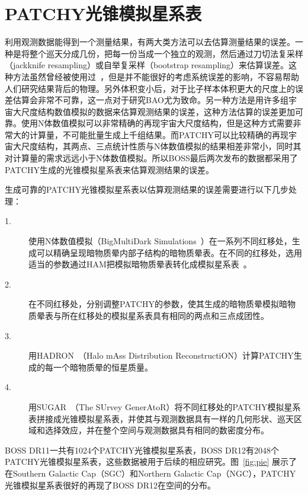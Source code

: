 \section{\textsc{PATCHY}光锥模拟星系表}
\label{sec:lightcone}

利用观测数据能得到一个测量结果，有两大类方法可以去估算测量结果的误差。一种是将整个巡天分成几份，把每一份当成一个独立的观测，然后通过刀切法复采样（jackknife resampling）或自举复采样（bootstrap resampling）来估算误差。这种方法虽然曾经被使用过~\cite{Norberg2009}，但是并不能很好的考虑系统误差的影响，不容易帮助人们研究结果背后的物理。另外体积变小后，对于比子样本体积更大的尺度上的误差估算会非常不可靠，这一点对于研究BAO尤为致命。另一种方法是用许多组宇宙大尺度结构数值模拟的数据来估算观测结果的误差，这种方法估算的误差更加可靠。使用N体数值模拟可以非常精确的再现宇宙大尺度结构，但是这种方式需要非常大的计算量，不可能批量生成上千组结果。而\textsc{PATCHY}可以比较精确的再现宇宙大尺度结构，其两点、三点统计性质与N体数值模拟的结果相差非常小，同时其对计算量的需求远远小于N体数值模拟。所以BOSS最后两次发布的数据都采用了\textsc{PATCHY}生成的光锥模拟星系表来估算观测结果的误差。

生成可靠的\textsc{PATCHY}光锥模拟星系表以估算观测结果的误差需要进行以下几步处理：
\begin{description}
\item[1.] 使用N体数值模拟（BigMultiDark Simulations~\cite{Klypin2014}）在一系列不同红移处，生成可以精确呈现暗物质晕内部子结构的暗物质晕表。在不同的红移处，选用适当的参数通过HAM把模拟暗物质晕表转化成模拟星系表~\cite{Rodriguez-Torres2016}。
\item[2.] 在不同红移处，分别调整\textsc{PATCHY}的参数，使其生成的暗物质晕模拟暗物质晕表与所在红移处的模拟星系表具有相同的两点和三点成团性。
\item[3.] 用HADRON~\cite{Zhaocheng2015}（Halo mAss Distribution ReconstructiON）计算\textsc{PATCHY}生成的每一个暗物质晕的恒星质量。
\item[4.] 用SUGAR~\cite{Rodriguez-Torres2016}（The SUrvey GenerAtoR）将不同红移处的\textsc{PATCHY}模拟星系表拼接成光锥模拟星系表，并使其与观测数据具有一样的几何形状、巡天区域和选择效应，并在整个空间与观测数据具有相同的数密度分布。
\end{description}

BOSS DR11一共有1024个\textsc{PATCHY}光锥模拟星系表，BOSS DR12有2048个\textsc{PATCHY}光锥模拟星系表，这些数据被用于后续的相应研究。图~\ref{fig:pie} 展示了在Southern Galactic Cap（SGC）和Northern Galactic Cap（NGC），\textsc{PATCHY}光锥模拟星系表很好的再现了BOSS DR12在空间的分布。

